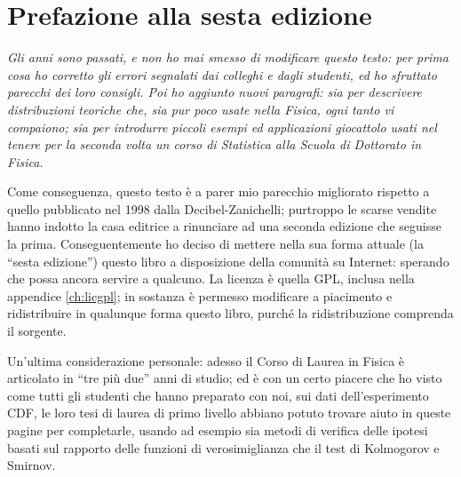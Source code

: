 \chapter*{Prefazione alla sesta edizione}

{\itshape Gli anni sono passati, e non ho mai smesso di
  modificare questo testo: per prima cosa ho corretto gli
  errori segnalati dai colleghi e dagli studenti, ed ho
  sfruttato parecchi dei loro consigli.  Poi ho aggiunto
  nuovi paragrafi: sia per descrivere distribuzioni teoriche
  che, sia pur poco usate nella Fisica, ogni tanto vi
  compaiono; sia per introdurre piccoli esempi ed
  applicazioni giocattolo usati nel tenere per la seconda
  volta un corso di Statistica alla Scuola di Dottorato in
  Fisica.

  Come conseguenza, questo testo \`e a parer mio parecchio
  migliorato rispetto a quello pubblicato nel 1998 dalla
  Decibel-Zanichelli; purtroppo le scarse vendite hanno
  indotto la casa editrice a rinunciare ad una seconda
  edizione che seguisse la prima.  Conseguentemente ho
  deciso di mettere nella sua forma attuale (la ``sesta
  edizione'') questo libro a disposizione della comunit\`a
  su Internet: sperando che possa ancora servire a qualcuno.
  La licenza \`e quella GPL, inclusa nella appendice
  \ref{ch:licgpl}; in sostanza \`e permesso modificare a
  piacimento e ridistribuire in qualunque forma questo
  libro, purch\'e la ridistribuzione comprenda il sorgente.

  Un'ultima considerazione personale: adesso il Corso di
  Laurea in Fisica \`e articolato in ``tre pi\`u due'' anni
  di studio; ed \`e con un certo piacere che ho visto come
  tutti gli studenti che hanno preparato con noi, sui dati
  dell'esperimento CDF, le loro tesi di laurea di primo
  livello abbiano potuto trovare aiuto in queste pagine per
  completarle, usando ad esempio sia metodi di verifica
  delle ipotesi basati sul rapporto delle funzioni di
  verosimiglianza che il test di Kolmogorov e Smirnov.

  \vfill{}
}

\endinput
